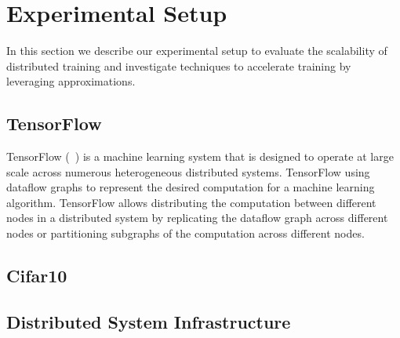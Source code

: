 \section{Experimental Setup}
In this section we describe our experimental setup to evaluate the scalability of distributed training and investigate techniques to accelerate training by leveraging approximations. 
\subsection{TensorFlow}
TensorFlow (~\cite{tensorflow}) is a machine learning system that is designed to operate at large scale across numerous heterogeneous distributed systems. TensorFlow using dataflow graphs to represent the desired computation for a machine learning algorithm. TensorFlow allows distributing the computation between different nodes in a distributed system by replicating the dataflow graph across different nodes or partitioning subgraphs of the computation across different nodes. 

\subsection{Cifar10}
\subsection{Distributed System Infrastructure}
